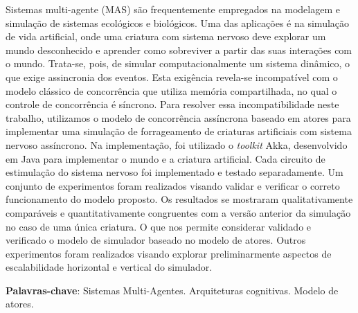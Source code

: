 

\begin{resumo}

Sistemas multi-agente (MAS) são frequentemente empregados na modelagem e simulação de sistemas ecológicos e biológicos. Uma das aplicações é na simulação de vida artificial, onde uma criatura com sistema nervoso deve explorar um mundo desconhecido e aprender como sobreviver a partir das suas interações com o mundo. Trata-se, pois, de simular computacionalmente um sistema dinâmico, o que exige assincronia dos eventos. Esta exigência revela-se incompatível com o modelo clássico de concorrência que utiliza memória compartilhada, no qual o controle de concorrência é síncrono. Para resolver essa incompatibilidade neste trabalho, utilizamos o modelo de concorrência assíncrona baseado em atores para implementar uma simulação de forrageamento de criaturas artificiais com sistema nervoso assíncrono. Na implementação, foi utilizado o \textit{toolkit} Akka, desenvolvido em Java para implementar o mundo e a criatura artificial. Cada circuito de estimulação do sistema nervoso foi implementado e testado separadamente. Um conjunto de experimentos foram realizados visando validar e verificar o correto funcionamento do modelo proposto. Os resultados se mostraram qualitativamente comparáveis e quantitativamente congruentes com a versão anterior da simulação no caso de uma única criatura. O que nos permite considerar validado e verificado o modelo de simulador baseado no modelo de atores. Outros experimentos foram realizados visando explorar preliminarmente aspectos de escalabilidade horizontal e vertical do simulador. 

\begin{comment}
 contexto: simulação de sistemas ecológicos utilizando MAS
 motivação: simular sistemas complexos e de larga escala com plausabilidade biológica
 justificativa: assincronia intrínseca deste tipo de modelo é incompatível com os modelos de programação utilizando memória compartilhada
 objetivo: implementar um simulador escalável utilizando o modelo de atores, bem como um sistema nervoso assíncrono
 metodologia: usar o toolkit akka implementado na linguagem Java para construir o mundo e a criatura artificial, testar os circuitos de estimulação da dinâmica interna, verificar e validar o modela via simulação de forrageamento
 resultado: Escalabilidade. Espera-se fazer as simulações em larga escala e com os resultados compatíveis com a literatura
\end{comment}


\textbf{Palavras-chave}: Sistemas Multi-Agentes. Arquiteturas cognitivas. Modelo de atores.
 

\end{resumo}




